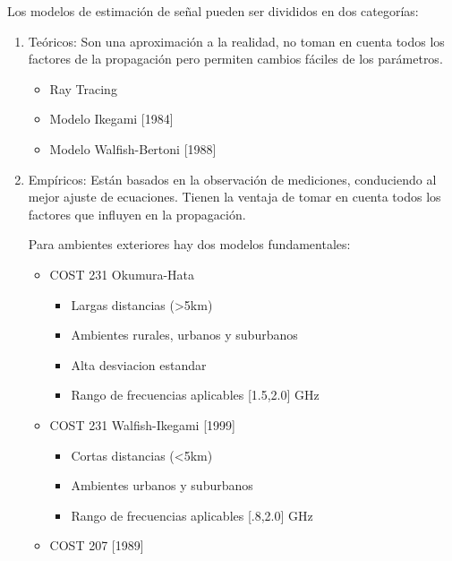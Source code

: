 Los modelos de estimación de señal pueden ser divididos en dos categorías:
\begin{enumerate}
    \item Teóricos: Son una aproximación a la realidad, no toman en cuenta todos los factores de la propagación pero permiten cambios fáciles de los parámetros. 
    \begin{itemize}
        \item Ray Tracing
        \item Modelo Ikegami [1984]
        \item Modelo Walfish-Bertoni [1988]
    \end{itemize}
    \item Empíricos: Están basados en la observación de mediciones, conduciendo al mejor ajuste de ecuaciones. Tienen la ventaja de tomar en cuenta todos los factores que influyen en la propagación.\newline
    
    Para ambientes exteriores hay dos modelos fundamentales:
    \begin{itemize}
        \item COST 231 Okumura-Hata
        \begin{itemize}
            \item Largas distancias (>5km)
            \item Ambientes rurales, urbanos y suburbanos
            \item Alta desviacion estandar
            \item Rango de frecuencias aplicables [1.5,2.0] GHz
        \end{itemize}
        \item COST 231 Walfish-Ikegami [1999]
        \begin{itemize}
            \item Cortas distancias (<5km)
            \item Ambientes urbanos y suburbanos
            \item Rango de frecuencias aplicables [.8,2.0] GHz
        \end{itemize}
        \item COST 207 [1989]
    \end{itemize}
\end{enumerate}

\break

